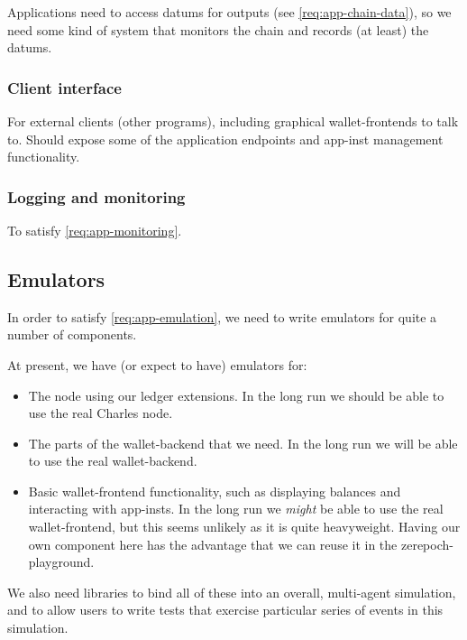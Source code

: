 \subsubsection{}

Applications need to access \glspl{datum} for outputs (see \cref{req:app-chain-data}), so we need some kind of system that monitors the chain and records (at least) the \glspl{datum}.

\subsubsection{Client interface}

For external clients (other programs), including graphical \glspl{wallet-frontend} to talk to.
Should expose some of the application endpoints and \gls{app-inst} management functionality.

\subsubsection{Logging and monitoring}

To satisfy \cref{req:app-monitoring}.

\subsection{Emulators}

In order to satisfy \cref{req:app-emulation}, we need to write emulators for quite a number of components.

At present, we have (or expect to have) emulators for:
\begin{itemize}
\item
  The \gls{node} using our ledger extensions.
  In the long run we should be able to use the real Charles \gls{node}.
\item
  The parts of the \gls{wallet-backend} that we need.
  In the long run we will be able to use the real \gls{wallet-backend}.
\item
  Basic \gls{wallet-frontend} functionality, such as displaying balances and interacting with \glspl{app-inst}.
  In the long run we \emph{might} be able to use the real \gls{wallet-frontend}, but this seems unlikely as it is quite heavyweight.
  Having our own component here has the advantage that we can reuse it in the \gls{zerepoch-playground}.
\end{itemize}

We also need libraries to bind all of these into an overall, multi-agent simulation, and to allow users to write tests that exercise particular series of events in this simulation.

